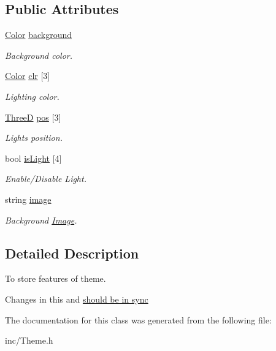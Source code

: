 \subsection*{Public Attributes}
\begin{DoxyCompactItemize}
\item 
\hypertarget{class_theme_a486d4eda08361ce1cb61a8f93dda8884}{\hyperlink{global_8h_aae4bd90e8e9fa4cdfa4e10e3494f755b}{Color} \hyperlink{class_theme_a486d4eda08361ce1cb61a8f93dda8884}{background}}\label{class_theme_a486d4eda08361ce1cb61a8f93dda8884}

\begin{DoxyCompactList}\small\item\em Background color. \end{DoxyCompactList}\item 
\hypertarget{class_theme_abb2caa63e627e47504fed37ec34023d0}{\hyperlink{global_8h_aae4bd90e8e9fa4cdfa4e10e3494f755b}{Color} \hyperlink{class_theme_abb2caa63e627e47504fed37ec34023d0}{clr} \mbox{[}3\mbox{]}}\label{class_theme_abb2caa63e627e47504fed37ec34023d0}

\begin{DoxyCompactList}\small\item\em Lighting color. \end{DoxyCompactList}\item 
\hypertarget{class_theme_ab948e47a7f15fe10a4a8c9794af91ac3}{\hyperlink{global_8h_a62cc051caefbc94bc22d587ea537d9e8}{Three\-D} \hyperlink{class_theme_ab948e47a7f15fe10a4a8c9794af91ac3}{pos} \mbox{[}3\mbox{]}}\label{class_theme_ab948e47a7f15fe10a4a8c9794af91ac3}

\begin{DoxyCompactList}\small\item\em Lights position. \end{DoxyCompactList}\item 
\hypertarget{class_theme_a2e2b3f1e6b563c30aecf9e41c5f512af}{bool \hyperlink{class_theme_a2e2b3f1e6b563c30aecf9e41c5f512af}{is\-Light} \mbox{[}4\mbox{]}}\label{class_theme_a2e2b3f1e6b563c30aecf9e41c5f512af}

\begin{DoxyCompactList}\small\item\em Enable/\-Disable Light. \end{DoxyCompactList}\item 
\hypertarget{class_theme_af6416fd1e8cace10a0a4d436ad5bd7c3}{string \hyperlink{class_theme_af6416fd1e8cace10a0a4d436ad5bd7c3}{image}}\label{class_theme_af6416fd1e8cace10a0a4d436ad5bd7c3}

\begin{DoxyCompactList}\small\item\em Background \hyperlink{class_image}{Image}. \end{DoxyCompactList}\end{DoxyCompactItemize}


\subsection{Detailed Description}
To store features of theme. 

Changes in this and \hyperlink{theme_reader_8h}{should be in sync }

The documentation for this class was generated from the following file\-:\begin{DoxyCompactItemize}
\item 
inc/Theme.\-h\end{DoxyCompactItemize}
